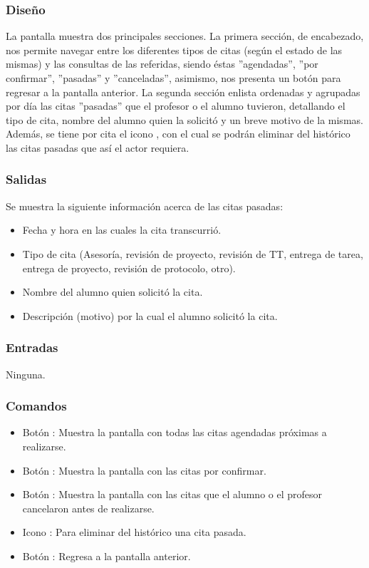 \subsubsection{Diseño}
	\noindent
	La pantalla muestra dos principales secciones. La primera sección, de encabezado, nos permite navegar entre los diferentes tipos de citas (según el estado de las mismas) y las consultas de las referidas, siendo éstas ''agendadas'', ''por confirmar'', ''pasadas'' y ''canceladas'', asimismo, nos presenta un botón para regresar a la pantalla anterior.
	\newline
	La segunda sección enlista ordenadas y agrupadas por día las citas ''pasadas'' que el profesor o el alumno tuvieron, detallando el tipo de cita, nombre del alumno quien la solicitó y un breve motivo de la mismas. Además, se tiene por cita el icono , con el cual se podrán eliminar del histórico las citas pasadas que así el actor requiera.

\pagebreak
{}

\subsubsection{Salidas}
	\noindent
	Se muestra la siguiente información acerca de las citas pasadas:
		\begin{itemize}
			\item Fecha y hora en las cuales la cita transcurrió.
			\item Tipo de cita (Asesoría, revisión de proyecto, revisión de TT, entrega de tarea, entrega de proyecto, revisión de protocolo, otro).
			\item Nombre del alumno quien solicitó la cita.
			\item Descripción (motivo) por la cual el alumno solicitó la cita.
		\end{itemize}

\subsubsection{Entradas}
	\noindent
	Ninguna.

\subsubsection{Comandos}
	\begin{itemize}
		\item Botón : Muestra la pantalla con todas las citas agendadas próximas a realizarse.
		\item Botón : Muestra la pantalla con las citas por confirmar.
		\item Botón : Muestra la pantalla con las citas que el alumno o el profesor cancelaron antes de realizarse.
		\item Icono : Para eliminar del histórico una cita pasada.
		\item Botón : Regresa a la pantalla anterior.
	\end{itemize}

